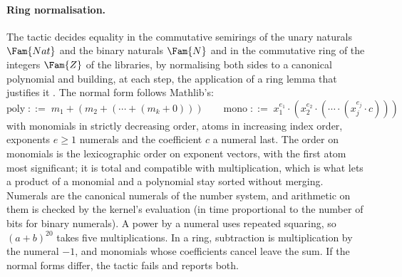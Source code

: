 \paragraph{Ring normalisation.}
The tactic  decides equality in the commutative semirings of the unary naturals $\Fam{Nat}$ and the binary naturals $\Fam{N}$ and in the commutative ring of the integers $\Fam{Z}$ of the libraries, by normalising both sides to a canonical polynomial and building, at each step, the application of a ring lemma that justifies it \citep{gregoire05,mathlib20}.
The normal form follows Mathlib's:
\[
\text{poly} \;::=\; m_1 + (m_2 + (\cdots + (m_k + 0)))
\qquad
\text{mono} \;::=\; x_1^{e_1}\cdot(x_2^{e_2}\cdot(\cdots\cdot(x_j^{e_j}\cdot c)))
\]
with monomials in strictly decreasing order, atoms in increasing index order, exponents $e\ge1$ numerals and the coefficient $c$ a numeral last.
The order on monomials is the lexicographic order on exponent vectors, with the first atom most significant; it is total and compatible with multiplication, which is what lets a product of a monomial and a polynomial stay sorted without merging.
Numerals are the canonical numerals of the number system, and arithmetic on them is checked by the kernel's evaluation (in time proportional to the number of bits for binary numerals).
A power by a numeral uses repeated squaring, so $(a+b)^{20}$ takes five multiplications.
In a ring, subtraction is multiplication by the numeral $-1$, and monomials whose coefficients cancel leave the sum.
If the normal forms differ, the tactic fails and reports both.

